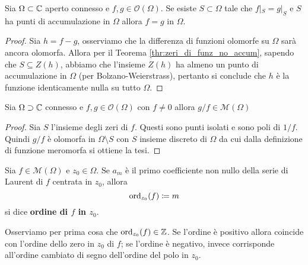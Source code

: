\begin{corollary}
    \label{cor:principio_indentita}
  Sia $\Omega \subset \mathbb{C}$ aperto connesso e $f,g \in \mathcal{O}(\Omega)$. Se
  esiste $S \subset \Omega$ tale che $f|_S = g|_S$ e $S$ ha punti di
  accumulazione in $\Omega$ allora $f = g$ in $\Omega$.
\end{corollary}
\begin{proof}
  Sia $h = f - g$, osserviamo che la differenza di funzioni olomorfe su $\Omega$
  sarà ancora olomorfa. Allora per il Teorema \ref{thr:zeri_di_funz_no_accum},
  sapendo che $S \subseteq Z(h)$, abbiamo che l'insieme $Z(h)$ ha almeno
  un punto di accumulazione in $\Omega$ (per Bolzano-Weierstrass), pertanto si
  conclude che $h$ è la funzione identicamente nulla su tutto $\Omega$.
\end{proof}

\begin{corollary}
	\label{thr:rapporto_olomorfe_diventa_meromorfa}
  Sia $\Omega \supset \mathbb{C}$ connesso e $f,g \in \mathcal{O}(\Omega)$ con $f \neq
  0$ allora $g / f \in \mathcal{M}(\Omega)$ 
\end{corollary}
\begin{proof}
  Sia $S$ l'insieme degli zeri di $f$. Questi sono punti isolati e sono poli 
  di $1/f$. Quindi $g/f$ è olomorfa in $\Omega \setminus S$ con $S$ insieme 
  discreto di $\Omega$ da cui dalla definizione di funzione meromorfa si 
  ottiene la tesi.
\end{proof}

\begin{definition}
\label{def:ordine_funz_meromorfa}
  Sia $f\in \mathcal{M}(\Omega)$ e $z_0 \in \Omega$. Se $a_m$ è il primo
  coefficiente non nullo della serie di Laurent di $f$ centrata in $z_0$, allora 
  \begin{equation*}
    \operatorname{ord}_{z_0} (f)  \coloneqq m
  \end{equation*}
  si dice \textbf{ordine di $f$ in $z_0$}.
\end{definition}

\begin{remark}
  Osserviamo per prima cosa che $\operatorname{ord}_{z_0}(f) \in \mathbb{Z}$. Se l'ordine è positivo
  allora coincide con l'ordine dello zero in $z_0$ di $f$; se l'ordine
  è negativo, invece corrisponde all'ordine cambiato di segno dell'ordine del
  polo in $z_0$.  
  \label{rmk:insight_ordine}
\end{remark}


